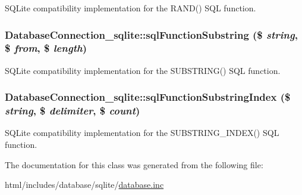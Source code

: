 \label{classDatabaseConnection__sqlite_aae54e984c066601c97c47328743cda1d}
SQLite compatibility implementation for the RAND() SQL function. \hypertarget{classDatabaseConnection__sqlite_a0523c014ec7d46a8a41ce949ba7f4434}{
\subsubsection[{sqlFunctionSubstring}]{\setlength{\rightskip}{0pt plus 5cm}DatabaseConnection\_\-sqlite::sqlFunctionSubstring (\$ {\em string}, \/  \$ {\em from}, \/  \$ {\em length})}}
\label{classDatabaseConnection__sqlite_a0523c014ec7d46a8a41ce949ba7f4434}
SQLite compatibility implementation for the SUBSTRING() SQL function. \hypertarget{classDatabaseConnection__sqlite_a11492dbbf74afed041b8dd14ec1d70f8}{
\subsubsection[{sqlFunctionSubstringIndex}]{\setlength{\rightskip}{0pt plus 5cm}DatabaseConnection\_\-sqlite::sqlFunctionSubstringIndex (\$ {\em string}, \/  \$ {\em delimiter}, \/  \$ {\em count})}}
\label{classDatabaseConnection__sqlite_a11492dbbf74afed041b8dd14ec1d70f8}
SQLite compatibility implementation for the SUBSTRING\_\-INDEX() SQL function. 

The documentation for this class was generated from the following file:\begin{DoxyCompactItemize}
\item 
html/includes/database/sqlite/\hyperlink{sqlite_2database_8inc}{database.inc}\end{DoxyCompactItemize}
